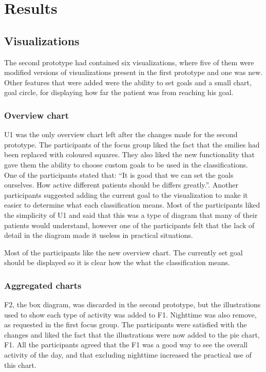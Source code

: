 \section{Results}

\subsection{Visualizations}
The second prototype had contained six visualizations, where five of them were modified versions of visualizations present in the first prototype and one was new. Other features that were added were the ability to set goals and a small chart, goal circle, for displaying how far the patient was from reaching his goal.

\subsubsection{Overview chart}
U1 was the only overview chart left after the changes made for the second prototype. The participants of the focus group liked the fact that the smilies had been replaced with coloured squares. They also liked the new functionality that gave them the ability to choose custom goals to be used in the classifications. One of the participants stated that: ``It is good that we can set the goals ourselves. How active different patients should be differs greatly.''. Another participants suggested adding the current goal to the visualization to make it easier to determine what each classification means. Most of the participants liked the simplicity of U1 and said that this was a type of diagram that many of their patients would understand, however one of the participants felt that the lack of detail in the diagram made it useless in practical situations.

Most of the participants like the new overview chart. The currently set goal should be displayed so it is clear how the what the classification means.

\subsubsection{Aggregated charts}
F2, the box diagram, was discarded in the second prototype, but the illustrations used to show each type of activity was added to F1. Nighttime was also remove, as requested in the first focus group. The participants were satisfied with the changes and liked the fact that the illustrations were now added to the pie chart, F1. All the participants agreed that the F1 was a good way to see the overall activity of the day, and that excluding nighttime increased the practical use of this chart.

